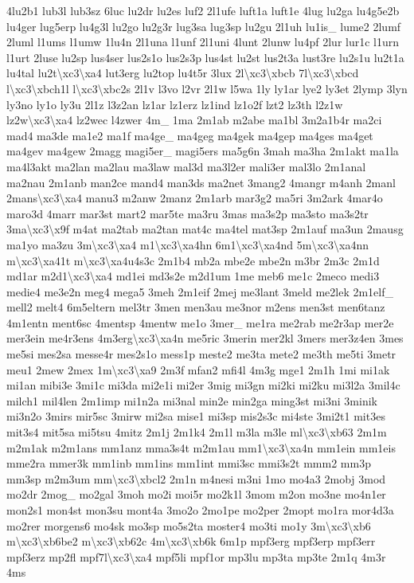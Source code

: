 \begin{DoxyCompactItemize}
4lu2b1 lub3l lub3sz 6luc lu2dr lu2es luf2 2l1ufe luft1a luft1e 4lug lu2ga lu4g5e2b lu4ger lug5erp lu4g3l lu2go lu2g3r lug3sa lug3sp lu2gu 2l1uh lu1is\-\_\- lume2 2lumf 2luml l1ums l1umw 1lu4n 2l1una l1unf 2l1uni 4lunt 2lunw lu4pf 2lur lur1c l1urn l1urt 2luse lu2sp lus4ser lus2s1o lus2s3p lus4st lu2st lus2t3a lust3re lu2s1u lu2t1a lu4tal lu2t\textbackslash{}xc3\textbackslash{}xa4 lut3erg lu2top lu4t5r 3lux 2l\textbackslash{}xc3\textbackslash{}xbcb 7l\textbackslash{}xc3\textbackslash{}xbcd l\textbackslash{}xc3\textbackslash{}xbch1l l\textbackslash{}xc3\textbackslash{}xbc2s 2l1v l3vo l2vr 2l1w l5wa 1ly ly1ar lye2 ly3et 2lymp 3lyn ly3no ly1o ly3u 2l1z l3z2an lz1ar lz1erz lz1ind lz1o2f lzt2 lz3th l2z1w lz2w\textbackslash{}xc3\textbackslash{}xa4 lz2wec l4zwer 4m\-\_\- 1ma 2m1ab m2abe ma1bl 3m2a1b4r ma2ci mad4 ma3de ma1e2 ma1f ma4ge\-\_\- ma4geg ma4gek ma4gep ma4ges ma4get ma4gev ma4gew 2magg magi5er\-\_\- magi5ers ma5g6n 3mah ma3ha 2m1akt ma1la ma4l3akt ma2lan ma2lau ma3law mal3d ma3l2er mali3er mal3lo 2m1anal ma2nau 2m1anb man2ce mand4 man3ds ma2net 3mang2 4mangr m4anh 2manl 2mans\textbackslash{}xc3\textbackslash{}xa4 manu3 m2anw 2manz 2m1arb mar3g2 ma5ri 3m2ark 4mar4o maro3d 4marr mar3st mart2 mar5te ma3ru 3mas ma3s2p ma3sto ma3s2tr 3ma\textbackslash{}xc3\textbackslash{}x9f m4at ma2tab ma2tan mat4c ma4tel mat3sp 2m1auf ma3un 2mausg ma1yo ma3zu 3m\textbackslash{}xc3\textbackslash{}xa4 m1\textbackslash{}xc3\textbackslash{}xa4hn 6m1\textbackslash{}xc3\textbackslash{}xa4nd 5m\textbackslash{}xc3\textbackslash{}xa4nn m\textbackslash{}xc3\textbackslash{}xa41t m\textbackslash{}xc3\textbackslash{}xa4u4s3c 2m1b4 mb2a mbe2e mbe2n m3br 2m3c 2m1d md1ar m2d1\textbackslash{}xc3\textbackslash{}xa4 md1ei md3s2e m2d1um 1me meb6 me1c 2meco medi3 medie4 me3e2n meg4 mega5 3meh 2m1eif 2mej me3lant 3meld me2lek 2m1elf\-\_\- mell2 melt4 6m5eltern mel3tr 3men men3au me3nor m2ens men3st men6tanz 4m1entn ment6sc 4mentsp 4mentw me1o 3mer\-\_\- me1ra me2rab me2r3ap mer2e mer3ein me4r3ens 4m3erg\textbackslash{}xc3\textbackslash{}xa4n me5ric 3merin mer2kl 3mers mer3z4en 3mes me5si mes2sa messe4r mes2s1o mess1p meste2 me3ta mete2 me3th me5ti 3metr meu1 2mew 2mex 1m\textbackslash{}xc3\textbackslash{}xa9 2m3f mfan2 mfi4l 4m3g mge1 2m1h 1mi mi1ak mi1an mibi3e 3mi1c mi3da mi2e1i mi2er 3mig mi3gn mi2ki mi2ku mi3l2a 3mil4c milch1 mil4len 2m1imp mi1n2a mi3nal min2e min2ga ming3st mi3ni 3minik mi3n2o 3mirs mir5sc 3mirw mi2sa mise1 mi3sp mis2s3c mi4ste 3mi2t1 mit3es mit3s4 mit5sa mi5tsu 4mitz 2m1j 2m1k4 2m1l m3la m3le ml\textbackslash{}xc3\textbackslash{}xb63 2m1m m2m1ak m2m1ans mm1anz mma3s4t m2m1au mm1\textbackslash{}xc3\textbackslash{}xa4n mm1ein mm1eis mme2ra mmer3k mm1inb mm1ins mm1int mmi3sc mmi3s2t mmm2 mm3p mm3sp m2m3um mm\textbackslash{}xc3\textbackslash{}xbcl2 2m1n m4nesi m3ni 1mo mo4a3 2mobj 3mod mo2dr 2mog\-\_\- mo2gal 3moh mo2i moi5r mo2k1l 3mom m2on mo3ne mo4n1er mon2s1 mon4st mon3su mont4a 3mo2o 2mo1pe mo2per 2mopt mo1ra mor4d3a mo2rer morgens6 mo4sk mo3sp mo5s2ta moster4 mo3ti mo1y 3m\textbackslash{}xc3\textbackslash{}xb6 m\textbackslash{}xc3\textbackslash{}xb6be2 m\textbackslash{}xc3\textbackslash{}xb62c 4m\textbackslash{}xc3\textbackslash{}xb6k 6m1p mpf3erg mpf3erp mpf3err mpf3erz mp2fl mpf7l\textbackslash{}xc3\textbackslash{}xa4 mpf5li mpf1or mp3lu mp3ta mp3te 2m1q 4m3r 4ms 
\end{DoxyCompactItemize}
